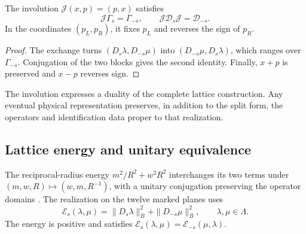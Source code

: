 \begin{proposition}
\label{prop:leech-split-involution}
The involution \(\mathcal J(x,p)=(p,x)\) satisfies
\[
 \mathcal J\Gamma_s=\Gamma_{-s},\qquad
 \mathcal J\mathcal D_s\mathcal J=\mathcal D_{-s}.
\]
In the coordinates \((p_L,p_R)\), it fixes \(p_L\) and reverses the sign
of \(p_R\).
\end{proposition}
\begin{proof}
The exchange turns
\((D_s\lambda,D_{-s}\mu)\) into
\((D_{-s}\mu,D_s\lambda)\), which ranges over \(\Gamma_{-s}\).
Conjugation of the two blocks gives the second identity.
Finally, \(x+p\) is preserved and \(x-p\) reverses sign.
\end{proof}

The involution expresses a duality of the complete lattice
construction. Any eventual physical representation preserves, in addition to
the split form, the operators and identification data
proper to that realization.

\subsection{Lattice energy and unitary equivalence}
\label{subsec:leech-energy}

The reciprocal-radius energy
\(m^2/R^2+w^2R^2\) interchanges its two terms under
\((m,w,R)\mapsto(w,m,R^{-1})\), with a unitary conjugation
preserving the operator domains \cite{HMT-IV}.
The realization on the twelve marked planes uses
\begin{equation}
 \mathcal E_s(\lambda,\mu)=
       \|D_s\lambda\|_B^2+\|D_{-s}\mu\|_B^2,
 \qquad \lambda,\mu\in\Lambda.
 \label{eq:leech-energy}
\end{equation}
The energy is positive and satisfies
\(\mathcal E_s(\lambda,\mu)=\mathcal E_{-s}(\mu,\lambda)\).

